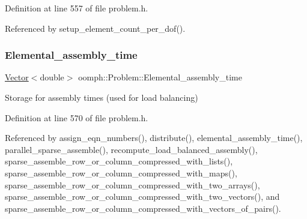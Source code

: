 Definition at line 557 of file problem.\+h.



Referenced by setup\+\_\+element\+\_\+count\+\_\+per\+\_\+dof().

\mbox{\label{classoomph_1_1Problem_a2b2bcde2b051f47278ccf8446699bbfb}} 
\subsubsection{\texorpdfstring{Elemental\+\_\+assembly\+\_\+time}{Elemental\_assembly\_time}}
{\footnotesize\ttfamily \hyperlink{classoomph_1_1Vector}{Vector}$<$double$>$ oomph\+::\+Problem\+::\+Elemental\+\_\+assembly\+\_\+time\hspace{0.3cm}{\ttfamily [protected]}}



Storage for assembly times (used for load balancing) 



Definition at line 570 of file problem.\+h.



Referenced by assign\+\_\+eqn\+\_\+numbers(), distribute(), elemental\+\_\+assembly\+\_\+time(), parallel\+\_\+sparse\+\_\+assemble(), recompute\+\_\+load\+\_\+balanced\+\_\+assembly(), sparse\+\_\+assemble\+\_\+row\+\_\+or\+\_\+column\+\_\+compressed\+\_\+with\+\_\+lists(), sparse\+\_\+assemble\+\_\+row\+\_\+or\+\_\+column\+\_\+compressed\+\_\+with\+\_\+maps(), sparse\+\_\+assemble\+\_\+row\+\_\+or\+\_\+column\+\_\+compressed\+\_\+with\+\_\+two\+\_\+arrays(), sparse\+\_\+assemble\+\_\+row\+\_\+or\+\_\+column\+\_\+compressed\+\_\+with\+\_\+two\+\_\+vectors(), and sparse\+\_\+assemble\+\_\+row\+\_\+or\+\_\+column\+\_\+compressed\+\_\+with\+\_\+vectors\+\_\+of\+\_\+pairs().

\mbox{\label{classoomph_1_1Problem_a71f87e46a571a54abd27a26f6c701c36}} 
